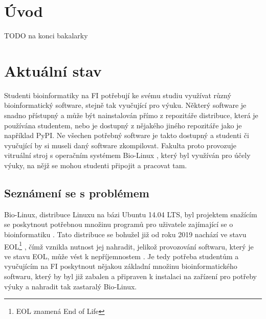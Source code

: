 \documentclass[
  digital,     %
  oneside,     %
  nosansbold,  %
  nocolorbold, %
  lof,         %
  lot,         %
]{fithesis4}
\begin{document}

\chapter*{Úvod}

TODO na konci bakalarky




\chapter{Aktuální stav}

Studenti bioinformatiky na FI potřebují ke svému studiu využívat různý
bioinformatický software, stejně tak vyučující pro výuku. Některý software
je snadno přístupný a může být nainstalován přímo z repozitáře
distribuce, která je používána studentem, nebo je dostupný z nějakého jiného
repozitáře jako je například PyPI. Ne všechen potřebný software je takto dostupný
a studenti či vyučující by si museli daný software zkompilovat. Fakulta proto 
provozuje vitruální stroj s operačním systémem Bio-Linux \cite{biolinux_fi},
který byl využíván pro účely výuky, na nějž se mohou studenti připojit a
pracovat tam.


\section{Seznámení se s problémem}

Bio-Linux, distribuce Linuxu na bázi Ubuntu 14.04 LTS, byl projektem snažícím se poskytnout
potřebnou množinu programů pro uživatele zajímající se o bioinformatiku
\cite{biolinux}. Tato distribuce se bohužel již od roku 2019 nachází ve stavu 
EOL\footnote{EOL znamená End of Life} \cite{biolinux_distrowatch}, čímž vznikla 
nutnost jej nahradit, jelikož provozování softwaru, který je ve stavu EOL, může
vést k nepříjemnostem \cite{eol}. Je tedy potřeba studentům a vyučujícím na FI
poskytnout nějakou základní množinu bioinformatického softwaru, který by byl již
zabalen a připraven k instalaci na zařízení pro potřeby výuky a nahradit tak 
zastaralý Bio-Linux.
\end{document}
